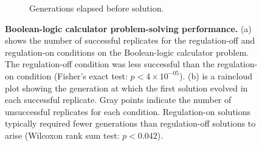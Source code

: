 \begin{figure}[ht]
\begin{subfigure}[b]{0.45\textwidth}
    \caption{\small Generations elapsed before solution.}
    \label{chapter:tag-based-regulation:subfig:boolean-calc-prefix-solve-time}
\end{subfigure}

\caption{\small
\textbf{Boolean-logic calculator problem-solving performance.}
(a) shows the number of successful replicates for the regulation-off and regulation-on conditions on the Boolean-logic calculator problem. 
The regulation-off condition was less successful than the regulation-on condition (Fisher's exact test: $p < 4\times10^{-05}$).
(b) is a raincloud plot showing the generation at which the first solution evolved in each successful replicate.
Gray points indicate the number of unsuccessful replicates for each condition.
Regulation-on solutions typically required fewer generations than regulation-off solutions to arise (Wilcoxon rank sum test: $p < 0.042$).
}

    
\label{chapter:tag-based-regulation:fig:boolean-calc-prefix-performance}
\end{figure}
